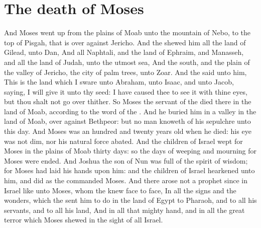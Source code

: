 \section*{The death of Moses}
\begin{biblechapter} %
\verse And Moses went up from the plains of Moab unto the mountain of Nebo, to the top of Pisgah, that is over against Jericho. And the \LORD shewed him all the land of Gilead, unto Dan,
\verse And all Naphtali, and the land of Ephraim, and Manasseh, and all the land of Judah, unto the utmost sea,
\verse And the south, and the plain of the valley of Jericho, the city of palm trees, unto Zoar.
\verse And the \LORD said unto him, This is the land which I sware unto Abraham, unto Isaac, and unto Jacob, saying, I will give it unto thy seed: I have caused thee to see it with thine eyes, but thou shalt not go over thither.
\verse So Moses the servant of the \LORD died there in the land of Moab, according to the word of the \LORD.
\verse And he buried him in a valley in the land of Moab, over against Bethpeor: but no man knoweth of his sepulchre unto this day.
\verse And Moses was an hundred and twenty years old when he died: his eye was not dim, nor his natural force abated.
\verse And the children of Israel wept for Moses in the plains of Moab thirty days: so the days of weeping and mourning for Moses were ended.
\verse And Joshua the son of Nun was full of the spirit of wisdom; for Moses had laid his hands upon him: and the children of Israel hearkened unto him, and did as the \LORD commanded Moses.
\verse And there arose not a prophet since in Israel like unto Moses, whom the \LORD knew face to face,
\verse In all the signs and the wonders, which the \LORD sent him to do in the land of Egypt to Pharaoh, and to all his servants, and to all his land,
\verse And in all that mighty hand, and in all the great terror which Moses shewed in the sight of all Israel.
\end{biblechapter}
